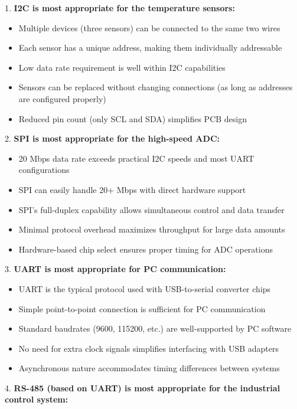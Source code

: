 \begin{example}
1. \textbf{I2C is most appropriate for the temperature sensors:}
   \begin{itemize}
     \item Multiple devices (three sensors) can be connected to the same two wires
     \item Each sensor has a unique address, making them individually addressable
     \item Low data rate requirement is well within I2C capabilities
     \item Sensors can be replaced without changing connections (as long as addresses are configured properly)
     \item Reduced pin count (only SCL and SDA) simplifies PCB design
   \end{itemize}
   \vspace{2mm}
2. \textbf{SPI is most appropriate for the high-speed ADC:}
   \begin{itemize}
     \item 20 Mbps data rate exceeds practical I2C speeds and most UART configurations
     \item SPI can easily handle 20+ Mbps with direct hardware support
     \item SPI's full-duplex capability allows simultaneous control and data transfer
     \item Minimal protocol overhead maximizes throughput for large data amounts
     \item Hardware-based chip select ensures proper timing for ADC operations
   \end{itemize}
   \vspace{2mm}
3. \textbf{UART is most appropriate for PC communication:}
   \begin{itemize}
     \item UART is the typical protocol used with USB-to-serial converter chips
     \item Simple point-to-point connection is sufficient for PC communication
     \item Standard baudrates (9600, 115200, etc.) are well-supported by PC software
     \item No need for extra clock signals simplifies interfacing with USB adapters
     \item Asynchronous nature accommodates timing differences between systems
   \end{itemize}
   \vspace{2mm}
4. \textbf{RS-485 (based on UART) is most appropriate for the industrial control system:}

\end{example}
